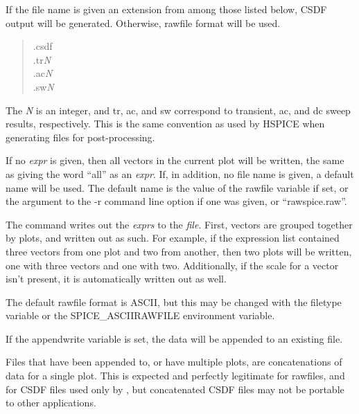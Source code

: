 If the file name is given an extension from among those listed
below, CSDF output will be generated.  Otherwise, rawfile format
will be used.
\begin{quote}
{\vt .csdf}\\
{\vt .tr}{\it N}\\
{\vt .ac}{\it N}\\
{\vt .sw}{\it N}
\end{quote}
The {\it N} is an integer, and {\vt tr}, {\vt ac}, and {\vt sw}
correspond to transient, ac, and dc sweep results, respectively.  This
is the same convention as used by HSPICE when generating files for
post-processing.
 
If no {\it expr} is given, then all vectors in the current plot will
be written, the same as giving the word ``{\vt all}'' as an {\it
expr}.  If, in addition, no file name is given, a default name will be
used.  The default name is the value of the {\et rawfile} variable if
set, or the argument to the {\vt -r} command line option if one was
given, or ``{\vt rawspice.raw}''.
 
The command writes out the {\it exprs} to the {\it file}.  First,
vectors are grouped together by plots, and written out as such.  For
example, if the expression list contained three vectors from one plot
and two from another, then two plots will be written, one with three
vectors and one with two.  Additionally, if the scale for a vector
isn't present, it is automatically written out as well.

The default rawfile format is ASCII, but this may be changed with the
{\et filetype} variable or the {\et SPICE\_ASCIIRAWFILE} environment
variable.

If the {\et appendwrite} variable is set, the data will be appended to
an existing file.

Files that have been appended to, or have multiple plots, are
concatenations of data for a single plot.  This is expected and
perfectly legitimate for rawfiles, and for CSDF files used only by
{\WRspice}, but concatenated CSDF files may not be portable to other
applications.


\subsection{}
\label{xeditor}


